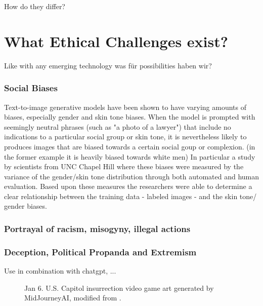 \documentclass[9pt,twocolumn,twoside]{osajnl}
\begin{document}
How do they differ?
\section{What Ethical Challenges exist?}
Like with any emerging technology 
was für possibilities haben wir?

\subsubsection*{Social Biases}
Text-to-image generative models have been shown to have varying amounts of biases, especially gender and skin tone biases. 
When the model is prompted with seemingly neutral phrases (such as "a photo of a lawyer") that include no indications to a particular social group or skin tone, it is nevertheless likely to produces images that are biased towards a certain social goup or complexion. (in the former example it is heavily biased towards white men) 
In particular a study by scientists from UNC Chapel Hill where these biases were measured by the variance of the gender/skin tone distribution through both automated and human evaluation. 
Based upon these measures the researchers were able to determine a clear relationship between the training data - labeled images - and the skin tone/ gender biases\cite{DallEval}. 


\subsubsection*{Portrayal of racism, misogyny, illegal actions}
\subsubsection*{Deception, Political Propanda and Extremism}
Use in combination with chatgpt, ...

\begin{figure}[htbp]
	\centering
	\caption{Jan 6. U.S. Capitol insurrection video game art generated by MidJourneyAI, modified from \cite{AIPropaganda}.}
\end{figure}
\end{document}
